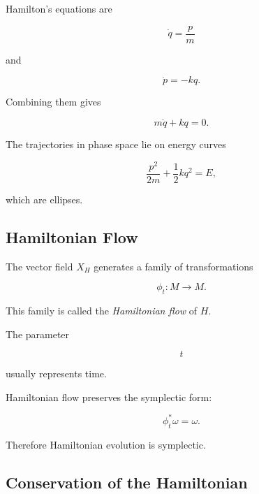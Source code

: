 Hamilton's equations are

\[
\boxed{
\dot q=\frac{p}{m}
}
\]

and

\[
\boxed{
\dot p=-kq.
}
\]

Combining them gives

\[
\boxed{
m\ddot q+kq=0.
}
\]

The trajectories in phase space lie on energy curves

\[
\frac{p^2}{2m}
+
\frac12kq^2
=
E,
\]

which are ellipses.

\begin{centereddiagram}
\end{centereddiagram}

\subsection{Hamiltonian Flow}
\label{subsec:hamiltonian-flow}

The vector field \(X_H\) generates a family of transformations

\[
\phi_t:M\to M.
\]

This family is called the \emph{Hamiltonian flow} of \(H\).

The parameter

\[
t
\]

usually represents time.

Hamiltonian flow preserves the symplectic form:

\[
\boxed{
\phi_t^*\omega=\omega.
}
\]

Therefore Hamiltonian evolution is symplectic.

\subsection{Conservation of the Hamiltonian}
\label{subsec:hamiltonian-conservation}

